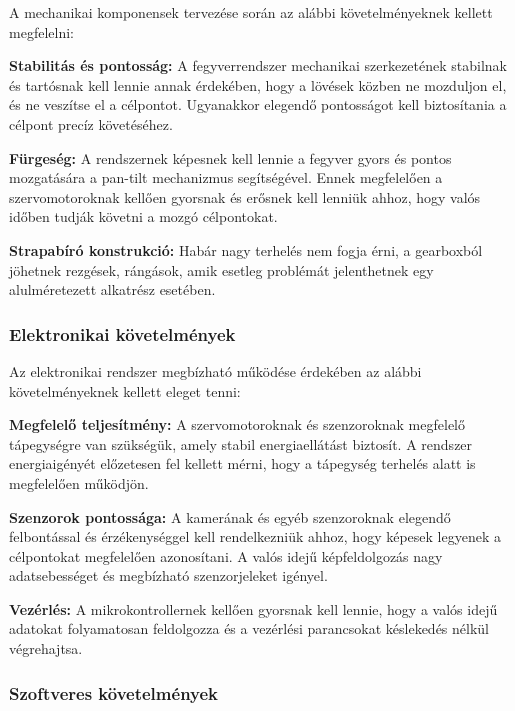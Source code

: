 \documentclass[12pt,a4paper]{article}
\begin{document}
A mechanikai komponensek tervezése során az alábbi követelményeknek kellett megfelelni:
\begin{list}{}{}
	\item \textbf{Stabilitás és pontosság:}  A fegyverrendszer mechanikai szerkezetének stabilnak és tartósnak kell lennie annak érdekében, hogy a lövések közben ne mozduljon el, és ne veszítse el a célpontot. Ugyanakkor elegendő pontosságot kell biztosítania a célpont precíz követéséhez.
	\item \textbf{Fürgeség:} A rendszernek képesnek kell lennie a fegyver gyors és pontos mozgatására a pan-tilt mechanizmus segítségével. Ennek megfelelően a szervomotoroknak kellően gyorsnak és erősnek kell lenniük ahhoz, hogy valós időben tudják követni a mozgó célpontokat.
	\item \textbf{Strapabíró konstrukció:} Habár nagy terhelés nem fogja érni, a gearboxból jöhetnek rezgések, rángások, amik esetleg problémát jelenthetnek egy alulméretezett alkatrész esetében.
\end{list}

\subsubsection*{Elektronikai követelmények}

Az elektronikai rendszer megbízható működése érdekében az alábbi követelményeknek kellett eleget tenni:

\begin{list}{}{}
	\item \textbf{Megfelelő teljesítmény:}  A szervomotoroknak és szenzoroknak megfelelő tápegységre van szükségük, amely stabil energiaellátást biztosít. A rendszer energiaigényét előzetesen fel kellett mérni, hogy a tápegység terhelés alatt is megfelelően működjön.
	\item \textbf{Szenzorok pontossága:} A kamerának és egyéb szenzoroknak elegendő felbontással és érzékenységgel kell rendelkezniük ahhoz, hogy képesek legyenek a célpontokat megfelelően azonosítani. A valós idejű képfeldolgozás nagy adatsebességet és megbízható szenzorjeleket igényel.
	\item\textbf{ Vezérlés:} A mikrokontrollernek kellően gyorsnak kell lennie, hogy a valós idejű adatokat folyamatosan feldolgozza és a vezérlési parancsokat késlekedés nélkül végrehajtsa.
\end{list}


\subsubsection*{Szoftveres követelmények}
\end{document}
